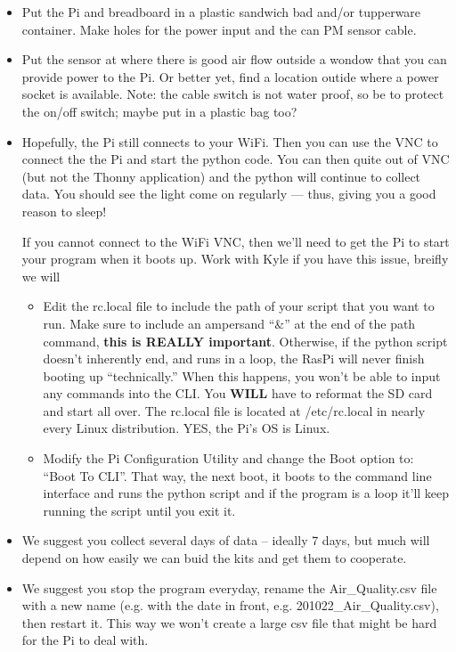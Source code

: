\documentclass{article}\usepackage[]{graphicx}\usepackage[]{color}
\begin{document}
\begin{itemize}
  \item Put the Pi and breadboard in a plastic sandwich bad and/or tupperware container. Make holes for the power input and the can PM sensor cable. 
  \item Put the sensor at where there is good air flow outside a wondow that you can provide power to the Pi. Or better yet, find a location outide where a power socket is available.  Note: the cable switch is not water proof, so be to protect the on/off switch; maybe put in a plastic bag too?
  \item Hopefully, the Pi still connects to your WiFi. Then you can use the VNC to connect the the Pi and start the python code. You can then quite out of VNC (but not the Thonny application) and the python will continue to collect data. You should see the light come on regularly --- thus, giving you a good reason to sleep!  
  
  If you cannot connect to the WiFi VNC, then we'll need to get the Pi to start your program when it boots up. Work with Kyle if you have this issue, breifly we will
  \begin{itemize}
  
\item Edit the rc.local file to include the path of your script that you want to run. Make sure to include an ampersand ``\&'' at the end of the path command, \textbf{this is REALLY important}. Otherwise, if the python script doesn't inherently end, and runs in a loop, the RasPi will never finish booting up ``technically.'' When this happens, you won't be able to input any commands into the CLI. You \textbf{WILL} have to reformat the SD card and start all over. The rc.local file is located at /etc/rc.local in nearly every Linux distribution. YES, the Pi's OS is Linux.
  \item Modify the Pi Configuration Utility and change the Boot option to: ``Boot To CLI''. That way, the next boot, it boots to the command line interface and runs the python script and if the program is a loop it'll keep running the script until you exit it.
  \end{itemize}

\item We suggest you collect several days of data -- ideally 7 days, but much will depend on how easily we can buid the kits and get them to cooperate. 
\item We suggest you stop the program everyday, rename the Air\_Quality.csv file with a new name (e.g. with the date in front, e.g. 201022\_Air\_Quality.csv), then restart it. This way we won't create a large csv file that might be hard for the Pi to deal with. 

\end{itemize}
\end{document}

